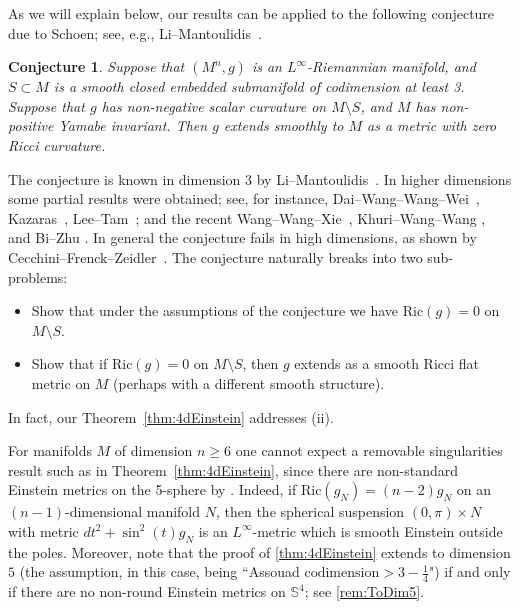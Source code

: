 \documentclass[12pt,a4paper,reqno]{amsart}
\newtheorem{conjecture}[theorem]{Conjecture}
\renewcommand{\geq}{\geqslant}
\begin{document}
As we will explain below, our results can be applied to the following conjecture due to Schoen; see, e.g., Li--Mantoulidis~\cite[Conjecture 1.5]{LiMantoulidis}. 

\begin{conjecture}\label{conj:Schoen}
    Suppose that $(M^n, g)$ is an $L^\infty$-Riemannian manifold, and $S\subset M$ is a smooth closed embedded submanifold of codimension at least 3. Suppose that $g$ has non-negative scalar curvature on $M\setminus S$, and $M$ has non-positive Yamabe invariant. Then $g$ extends smoothly to $M$ as a metric with zero Ricci curvature. 
\end{conjecture}

The conjecture is known in dimension 3 by
Li--Mantoulidis~\cite{LiMantoulidis}. In higher dimensions some partial results were obtained; see, for instance, Dai--Wang--Wang--Wei~\cite{DWWW}, Kazaras~\cite{Kazaras}, Lee--Tam~\cite{LeeTam}; and the recent Wang--Wang--Xie~\cite{WWX26}, Khuri--Wang--Wang \cite{KWW26}, and Bi--Zhu \cite{BZ26}. In general the conjecture fails in high dimensions, as shown by Cecchini--Frenck--Zeidler~\cite{CecchiniFrenckZeidler}. The conjecture naturally breaks into two sub-problems:
\begin{itemize}
    \item[(i)] Show that under the assumptions of the conjecture we have $\mathrm{Ric}(g) = 0$ on $M\setminus S$.
    \item[(ii)] Show that if $\mathrm{Ric}(g)= 0$ on $M\setminus S$, then $g$ extends as a smooth Ricci flat metric on $M$ (perhaps with a different smooth structure). 
\end{itemize}
In fact, our Theorem~\ref{thm:4dEinstein} addresses (ii).

For manifolds $M$ of dimension $n\geq 6$ one cannot expect a removable singularities result such as in Theorem~\ref{thm:4dEinstein}, since there are non-standard Einstein metrics on the 5-sphere by \cite{Bohm}. Indeed, if $\mathrm{Ric}(g_N) = (n-2)g_N$ on an $(n-1)$-dimensional manifold $N$, then the spherical suspension $(0,\pi)\times N$ with metric $dt^2+\sin^2(t)g_N$ is an $L^\infty$-metric which is smooth Einstein outside the poles. Moreover, note that the proof of \cref{thm:4dEinstein} extends to dimension $5$ (the assumption, in this case, being ``Assouad $\mathrm{codimension}>3-\frac{1}{4}$") if and only if there are no non-round Einstein metrics on $\mathbb S^4$; see \cref{rem:ToDim5}. 
\end{document}
